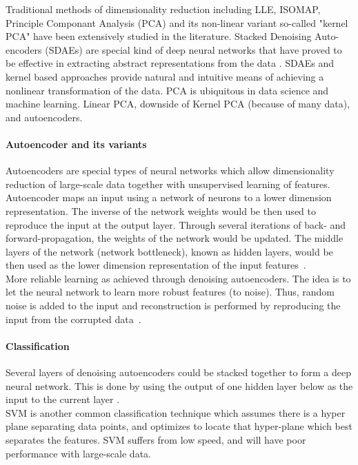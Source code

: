 \documentclass{article}
\begin{document}
Traditional methods of dimensionality reduction including LLE, ISOMAP, Principle Componant Analysis (PCA) and its non-linear variant so-called "kernel PCA" have been extensively studied in the literature. Stacked Denoising Auto-encoders (SDAEs) are special kind of deep neural networks that have proved to be effective in extracting abstract representations from the data \cite{vincent2010stacked}. SDAEs and kernel based approaches provide natural and intuitive means of achieving a nonlinear transformation of the data. PCA \cite{pearson1901liii} is ubiquitous in data science and machine learning. Linear PCA, downside of Kernel PCA (because of many data), and autoencoders.

\paragraph{Autoencoder and its variants} 
Autoencoders are special types of neural networks which allow dimensionality reduction of large-scale data together with unsupervised learning of features. Autoencoder maps an input using a network of neurons to a lower dimension representation. The inverse of the network weights would be then used to reproduce the input at the output layer. Through several iterations of back- and forward-propagation, the weights of the network would be updated. The middle layers of the network (network bottleneck), known as hidden layers, would be then used as the lower dimension representation of the input features~\cite{bengio2007greedy}.\\

More reliable learning as achieved through denoising autoencoders. The idea is to let the neural network to learn more robust features (to noise). Thus, random noise is added to the input and reconstruction is performed by reproducing the input from the corrupted data~\cite{vincent2008extracting}.

\paragraph{Classification} 

Several layers of denoising autoencoders could be stacked together to form a deep neural network. This is done by using the output of one hidden layer below as the input to the current layer \cite{vincent2010stacked}. \\

SVM is another common classification technique which assumes there is a hyper plane separating data points, and optimizes to locate that hyper-plane which best separates the features. SVM suffers from low speed, and will have poor performance with large-scale data.\\
\end{document}
